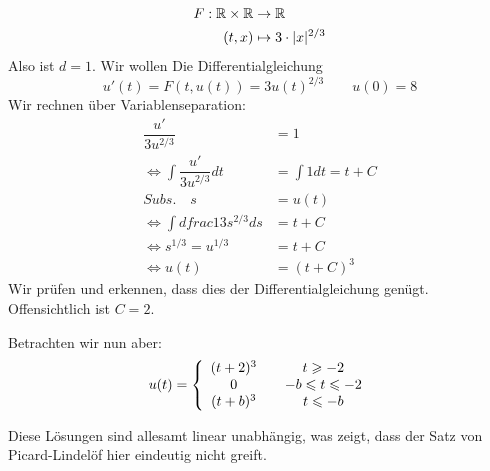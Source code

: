 \documentclass[main.tex]{subfiles}
\begin{document}
\begin{Beispiel}[Gegenbeispiel]
  $$\begin{aligned}
      F: \R \times \R & \to \R \\
      (t,x) & \mapsto 3 \cdot |x|^{2/3}
    \end{aligned}$$
  Also ist $d = 1$. Wir wollen Die Differentialgleichung
  $$u'(t) = F(t,u(t)) = 3 u(t)^{2/3} \qquad u(0) = 8$$
  Wir rechnen über Variablenseparation:
  $$\begin{aligned}
    \dfrac{u'}{3u^{2/3}} & = 1 \\
    \Leftrightarrow \int \dfrac{u'}{3u^{2/3}} dt & = \int 1 dt = t + C \\
     Subs. \quad s & = u(t) \\
    \Leftrightarrow \int df rac{1}{3s^{2/3}} ds & = t + C \\
    \Leftrightarrow s^{1/3} = u^{1/3} & = t+ C \\
    \Leftrightarrow u(t) & = (t+C)^3
  \end{aligned}$$
  Wir prüfen und erkennen, dass dies der Differentialgleichung genügt. Offensichtlich ist $C = 2$.

  Betrachten wir nun aber:
  $$u(t) = \left\{\begin{array}{c c c}
    (t + 2)^3 & & t \geq -2 \\
    0 & & -b \leq t \leq -2 \\
    (t + b)^3 & & t \leq- b
  \end{array}\right.$$

  \begin{center}
  \end{center}
  Diese Lösungen sind allesamt linear unabhängig, was zeigt, dass der Satz von Picard-Lindelöf hier eindeutig nicht greift.
\end{Beispiel}
\end{document}
